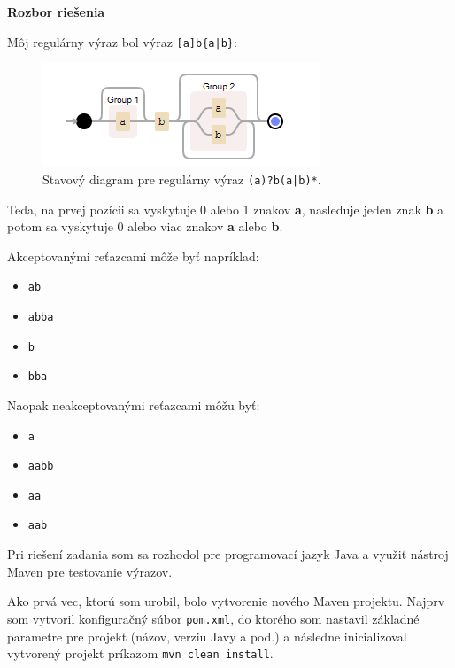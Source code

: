 \documentclass[12pt,a4paper]{article}
\newcommand{\noindentfix}{\vspace{10pt}\noindent}
\newcommand{\chapterheader}[1]{{\noindent\fontsize{18}{14}\textbf{#1}\vspace{2pt}}}
\begin{document}

    \chapterheader{Rozbor riešenia}

    \noindentfix Môj regulárny výraz bol výraz \texttt{[a]b\{a|b\}}:
    \begin{figure}[h]
        \centering
        \includegraphics{./stavovy-diagram-pre-regularny-vyraz.png}
        \caption{Stavový diagram pre regulárny výraz \texttt{(a)?b(a|b)*}.}
        \label{fig:stavovy-diagram}
    \end{figure}

    \noindentfix Teda, na prvej pozícii sa vyskytuje 0 alebo 1 znakov \textbf{a}, nasleduje jeden znak \textbf{b} a potom sa vyskytuje 0 alebo viac znakov \textbf{a} alebo \textbf{b}.

    \noindentfix Akceptovanými reťazcami môže byť napríklad:
    \begin{itemize}
        \setlength{\parskip}{0pt}
        \setlength{\itemsep}{0pt}
        \item \texttt{ab}
        \item \texttt{abba}
        \item \texttt{b}
        \item \texttt{bba}
    \end{itemize}

    \noindentfix Naopak neakceptovanými reťazcami môžu byť:
    \begin{itemize}
        \setlength{\parskip}{0pt}
        \setlength{\itemsep}{0pt}
        \item \texttt{a}
        \item \texttt{aabb}
        \item \texttt{aa}
        \item \texttt{aab}
    \end{itemize}

    \noindentfix Pri riešení zadania som sa rozhodol pre programovací jazyk Java a využiť nástroj Maven pre testovanie výrazov.

    \noindentfix Ako prvá vec, ktorú som urobil, bolo vytvorenie nového Maven projektu. Najprv som vytvoril konfiguračný súbor \texttt{pom.xml}, do ktorého som nastavil základné parametre pre projekt (názov, verziu Javy a pod.) a následne inicializoval vytvorený projekt príkazom \texttt{mvn clean install}.
\end{document}
